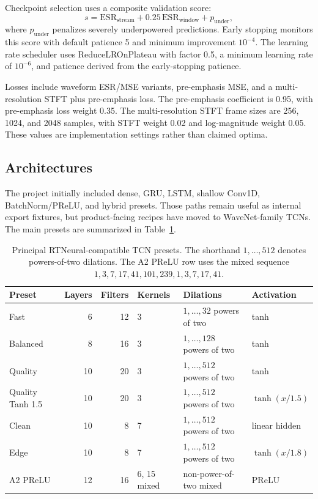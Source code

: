 \documentclass[11pt]{article}
\newcommand{\esr}{\mathrm{ESR}}
\begin{document}
Checkpoint selection uses a composite validation score:
\begin{equation}
  s = \esr_{\mathrm{stream}} + 0.25\,\esr_{\mathrm{window}} + p_{\mathrm{under}},
\end{equation}
where \(p_{\mathrm{under}}\) penalizes severely underpowered predictions. Early
stopping monitors this score with default patience 5 and minimum improvement
\(10^{-4}\). The learning rate scheduler uses ReduceLROnPlateau with factor
0.5, a minimum learning rate of \(10^{-6}\), and patience derived from the
early-stopping patience.

Losses include waveform ESR/MSE variants, pre-emphasis MSE, and a
multi-resolution STFT plus pre-emphasis loss. The pre-emphasis coefficient is
0.95, with pre-emphasis loss weight 0.35. The multi-resolution STFT frame sizes
are 256, 1024, and 2048 samples, with STFT weight 0.02 and log-magnitude weight
0.05. These values are implementation settings rather than claimed optima.

\subsection{Architectures}

The project initially included dense, GRU, LSTM, shallow Conv1D,
BatchNorm/PReLU, and hybrid presets. Those paths remain useful as internal
export fixtures, but product-facing recipes have moved to WaveNet-family TCNs.
The main presets are summarized in Table~\ref{tab:presets}.

\begin{table}[t]
\centering
\small
\begin{tabular}{@{}lrrp{2.2cm}p{3.0cm}p{2.2cm}@{}}
\toprule
Preset & Layers & Filters & Kernels & Dilations & Activation \\
\midrule
Fast & 6 & 12 & 3 & \(1,\ldots,32\) powers of two & tanh \\
Balanced & 8 & 16 & 3 & \(1,\ldots,128\) powers of two & tanh \\
Quality & 10 & 20 & 3 & \(1,\ldots,512\) powers of two & tanh \\
Quality Tanh 1.5 & 10 & 20 & 3 & \(1,\ldots,512\) powers of two & \(\tanh(x/1.5)\) \\
Clean & 10 & 8 & 7 & \(1,\ldots,512\) powers of two & linear hidden \\
Edge & 10 & 8 & 7 & \(1,\ldots,512\) powers of two & \(\tanh(x/1.8)\) \\
A2 PReLU & 12 & 16 & 6, 15 mixed & non-power-of-two mixed & PReLU \\
\bottomrule
\end{tabular}
\caption{Principal RTNeural-compatible TCN presets. The shorthand
\(1,\ldots,512\) denotes powers-of-two dilations. The A2 PReLU row uses the
mixed sequence \(1,3,7,17,41,101,239,1,3,7,17,41\).}
\label{tab:presets}
\end{table}
\end{document}
